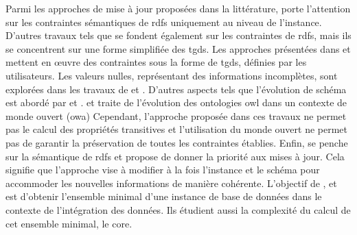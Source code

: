 Parmi les approches de mise à jour proposées dans la littérature, \cite{goasdoueEfficientQueryAnswering2013} porte l'attention sur les contraintes sémantiques de \gls{rdfs} uniquement au niveau de l'instance.
D'autres travaux tels que \cite{halfedferrariRDFUpdatesConstraints2017} se fondent également sur les contraintes de \gls{rdfs}, mais ils se concentrent sur une forme simplifiée des \glspl{tgd}.
Les approches présentées dans \cite{flourisFormalFoundationsRDF2013} et \cite{chabinUsingGraphGrammar2019} mettent en œuvre des contraintes sous la forme de \glspl{tgd}, définies par les utilisateurs.
Les valeurs nulles, représentant des informations incomplètes, sont explorées dans les travaux de \cite{halfedferrariRDFUpdatesConstraints2017} et \cite{chabinUsingGraphGrammar2019}.
D'autres aspects tels que l'évolution de schéma est abordé par \cite{flourisFormalFoundationsRDF2013} et \cite{goasdoueEfficientQueryAnswering2013}.
\cite{mahfoudhAdaptationOntologiesAvec2015} et \cite{mahfoudhAlgebraicGraphTransformations2015} traite de l'évolution des ontologies \gls{owl} dans un contexte de monde ouvert (\acs{owa})
Cependant, l'approche proposée dans ces travaux ne permet pas le calcul des propriétés transitives et l'utilisation du monde ouvert ne permet pas de garantir la préservation de toutes les contraintes établies.
Enfin, \cite{chabinUsingGraphGrammar2019} se penche sur la sémantique de \gls{rdfs} et propose de donner la priorité aux mises à jour.
Cela signifie que l'approche vise à modifier à la fois l'instance et le schéma pour accommoder les nouvelles informations de manière cohérente.
L'objectif de \cite{faginDataExchangeGetting2005}, \cite{gottlobComputingCoresData2005} et \cite{pichlerComplexityEvaluatingTuple2011} est d'obtenir l'ensemble minimal d'une instance de base de données dans le contexte de l'intégration des données.
Ils étudient aussi la complexité du calcul de cet ensemble minimal, le \gls{core}.

